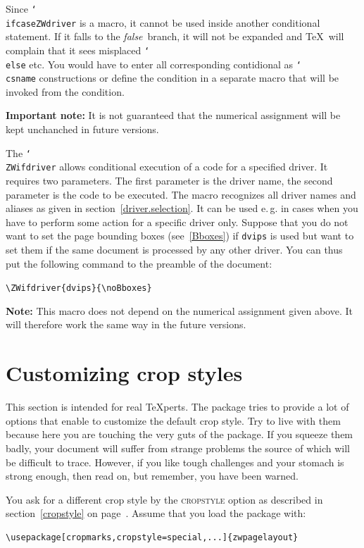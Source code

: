 \documentclass[11pt]{article}
\makeatletter
\def\mg#1{\ifvmode\leavevmode\fi\marginpar{\texttt{#1}}\ignorespaces}
\def\cmg#1{\mg{\char`\\#1}}
\def\opt#1{\texorpdfstring{\textmd{\textsc{#1}}}{#1}}
\DeclareRobustCommand\cmd[1]{\texttt{\char`\\#1}}
\def\eg.{e.\,g.\@}
\def\false{\bool{false}}
\def\bool#1{\texorpdfstring{\textit{#1}}{#1}}
\let\zwcomma\,
\def\,{\texorpdfstring{\zwcomma}{}}
\makeatother
\begin{document}
\vb
Since \cmd{ifcaseZWdriver} is a macro, it cannot be used inside another conditional statement. If
it falls to the \false\ branch, it will not be expanded and \TeX\ will complain that it sees
misplaced \cmd{else} etc. You would have to enter all corresponding contidional as \cmd{csname}
constructions or define the condition in a separate macro that will be invoked from the condition.

\textbf{Important note:} It is not guaranteed that the numerical assignment will be kept unchanched
in future versions.

\cmg{ZWifdriver}
The \cmd{ZWifdriver} allows conditional execution of a code for a specified driver. It requires two
parameters. The first parameter is the driver name, the second parameter is the code to be
executed. The macro recognizes all driver names and aliases as given in
section~\ref{driver.selection}. It can be used \eg. in cases when you have to perform some action
for a specific driver only. Suppose that you do not want to set the page bounding boxes
(see~\ref{Bboxes}) if \texttt{dvips} is used but want to set them if the same document is
processed by any other driver. You can thus put the following command to the preamble of the
document:

\vb \noindent
\verb.\ZWifdriver{dvips}{\noBboxes}.

\vb
\textbf{Note:} This macro does not depend on the numerical assignment given above. It will
therefore work the same way in the future versions.

\section{Customizing crop styles}
This section is intended for real \TeX perts. The package tries to provide a lot of options that
enable to customize the default crop style. Try to live with them because here you are touching the
very guts of the package. If you squeeze them badly, your document will suffer from strange
problems the source of which will be difficult to trace. However, if you like tough challenges and
your stomach is strong enough, then read on, but remember, you have been warned.

You ask for a different crop style by the \opt{cropstyle} option as described in
section~\ref{cropstyle} on page~\pageref{cropstyle}. Assume that you load the package with:

\vb
\begin{verbatim}
\usepackage[cropmarks,cropstyle=special,...]{zwpagelayout}
\end{verbatim}
\end{document}
